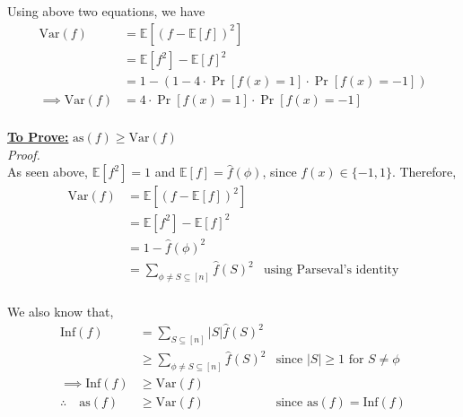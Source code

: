 \documentclass{article}
\begin{document}
\noindent
Using above two equations, we have
\begin{align*}
	\text{Var}(f) &= \mathbb{E}[{(f - \mathbb{E}[f])}^2] \\
	&= \mathbb{E}[f^2] - \mathbb{E}[f]^2 \\
	&= 1 - (1 - 4 \cdot \Pr[f(x) = 1] \cdot \Pr[f(x) = -1]) \\
\implies \text{Var}(f) &= \boxed{4 \cdot \Pr[f(x) = 1] \cdot \Pr[f(x) = -1]} \\
\end{align*}
\vspace*{-16mm}\begin{flushright}\qedsymbol\end{flushright} 


\noindent
\underline{\textbf{To Prove:}} $\text{as}(f) \geq \text{Var}(f)$\\

\noindent
\textit{Proof.} \\
As seen above, $\mathbb{E}[f^2] = 1$ and $\mathbb{E}[f] = \widehat{f}(\phi)$, since $f(x) \in \{-1, 1\}$. Therefore,
\begin{align*}
	\text{Var}(f) &= \mathbb{E}[{(f - \mathbb{E}[f])}^2] \\
	&= \mathbb{E}[f^2] - \mathbb{E}[f]^2 \\
	&= 1 - \widehat{f}(\phi)^2 \\
	&= \sum_{\phi \neq S \subseteq [n]} \widehat{f}(S)^2 &\text{using Parseval's identity} \\
\end{align*}

\noindent
We also know that,
\begin{align*}
	\text{Inf}(f) &= \sum_{S \subseteq [n]} |S| \widehat{f}(S)^2 \\
	&\geq \sum_{\phi \neq S \subseteq [n]} \widehat{f}(S)^2 & \text{since } |S| \geq 1 \text{ for } S \neq \phi \\
\implies \text{Inf}(f) &\geq \text{Var}(f) \\
\therefore \quad \text{as}(f) &\geq \text{Var}(f) &\text{since } \text{as}(f) = \text{Inf}(f) \\
\end{align*}
\vspace*{-16mm}\begin{flushright}\qedsymbol\end{flushright}



\subsection{}
\vspace*{-8mm}
\end{document}
